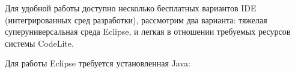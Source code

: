 




Для удобной работы доступно несколько бесплатных вариантов IDE (интегрированных сред разработки),
рассмотрим два варианта: тяжелая суперуниверсальная среда Eclipse, и легкая в отношении требуемых
ресурсов системы CodeLite.

\bigskip Для работы Eclipse требуется установленная Java:

\bigskip{}

\bigskip{}


